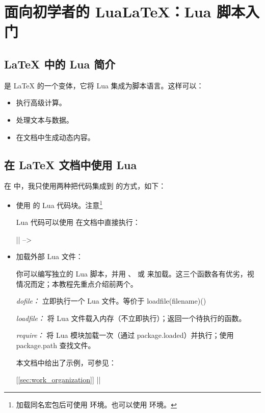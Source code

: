 \newpage
\section{面向初学者的 LuaLaTeX：Lua 脚本入门}

\subsection{LaTeX 中的 Lua 简介}

\tkzEngine{\LUALATEX} 是 LaTeX 的一个变体，它将 Lua 集成为脚本语言。这样可以：

\begin{itemize}
  \item 执行高级计算。
  \item 处理文本与数据。
  \item 在文档中生成动态内容。
\end{itemize}

\subsection{在 LaTeX 文档中使用 Lua}

在  中，我只使用两种把代码集成到  的方式，如下：

\begin{itemize}
  \item  使用  的 Lua 代码块。注意\footnote{加载同名宏包后可使用  环境。也可以使用  环境。}

  Lua 代码可以使用  在文档中直接执行：

  || -->  

  \item  加载外部 Lua 文件：

  你可以编写独立的 Lua 脚本，并用 、 或  来加载。这三个函数各有优劣，视情况而定；本教程先重点介绍前两个。

 \emph{dofile：}   立即执行一个 Lua 文件。等价于 loadfile(filename)()

\emph{loadfile：}    将 Lua 文件载入内存（不立即执行）；返回一个待执行的函数。

\emph{require：} 将 Lua 模块加载一次（通过 package.loaded）并执行；使用 package.path 查找文件。


本文档中给出了示例，可参见：

 [\ref{sec:work_organization}] ||


\end{itemize}

